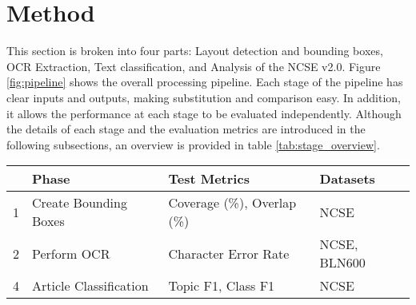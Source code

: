 \documentclass{article} %
\begin{document}
\section{Method}

This section is broken into four parts: Layout detection and bounding boxes, OCR Extraction, Text classification, and Analysis of the NCSE v2.0. Figure \ref{fig:pipeline} shows the overall processing pipeline. Each stage of the pipeline has clear inputs and outputs, making substitution and comparison easy. In addition, it allows the performance at each stage to be evaluated independently. Although the details of each stage and the evaluation metrics are introduced in the following subsections, an overview is provided in table \ref{tab:stage_overview}.

\begin{table*}
\centering
\begin{tabular}{llll}
\toprule
&\textbf{Phase} & \textbf{Test Metrics} & \textbf{Datasets} \\
\midrule
1 & Create Bounding Boxes & Coverage (\%), Overlap (\%) & NCSE \\
2 & Perform OCR & Character Error Rate & NCSE, BLN600 \\
4 & Article Classification & Topic F1, Class F1 & NCSE \\
\bottomrule
\end{tabular}
\caption{Overview of pipeline phases with corresponding evaluation metrics and datasets used for testing.}
\label{tab:stage_overview}
\end{table*}
\end{document}
